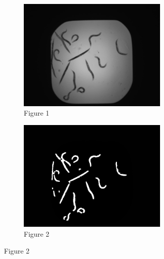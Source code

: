 \documentclass[a4paper,12pt]{article}
\begin{document}
\begin{figure}[ht!]
    \centering
    \begin{subfigure}{0.5\textwidth}
        \centering
        \includegraphics[width=0.8\textwidth]{A01_step0.jpg}
        \captionsetup{labelformat=empty}
        \caption{Figure 1}
    \end{subfigure}%
    \begin{subfigure}{0.5\textwidth}
        \centering
        \includegraphics[width=0.8\textwidth]{A01_step1.jpg}
        \captionsetup{labelformat=empty}
        \caption{Figure 2}
    \end{subfigure}
\end{figure}
\end{document}
